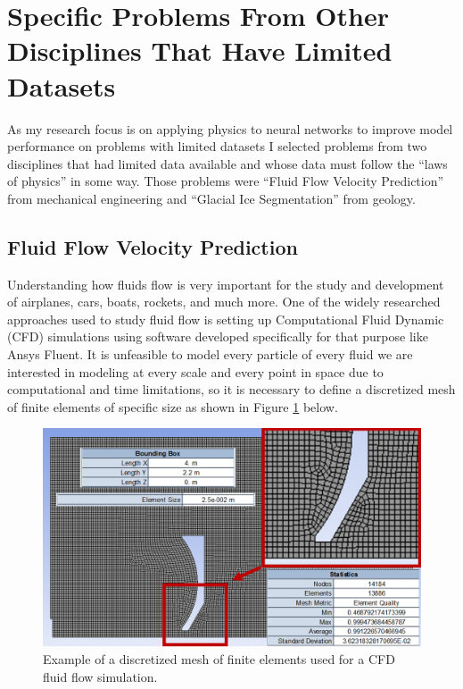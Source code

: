 \section{Specific Problems From Other Disciplines That Have Limited Datasets}
As my research focus is on applying physics to neural networks to improve model performance on problems with limited datasets I selected problems from two disciplines that had limited data available and whose data must follow the ``laws of physics'' in some way. Those problems were ``Fluid Flow Velocity Prediction'' from mechanical engineering and ``Glacial Ice Segmentation'' from geology.

\subsection{Fluid Flow Velocity Prediction}
Understanding how fluids flow is very important for the study and development of airplanes, cars, boats, rockets, and much more. One of the widely researched approaches used to study fluid flow is setting up Computational Fluid Dynamic (CFD) simulations using software developed specifically for that purpose like Ansys Fluent\cite{ANSYS}. It is unfeasible to model every particle of every fluid we are interested in modeling at every scale and every point in space due to computational and time limitations, so it is necessary to define a discretized mesh of finite elements of specific size as shown in Figure \ref{fig:cfd_mesh} below.

\begin{figure}[H] \centering
    \includegraphics[width=\linewidth]{figures/cfd_mesh.png}
    \caption{Example of a discretized mesh of finite elements used for a CFD fluid flow simulation.}
    \label{fig:cfd_mesh}
\end{figure}

